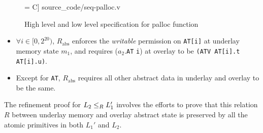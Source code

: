 \begin{figure}[t]\centering
\begin{minipage}{0.55\textwidth}
 = C] {source_code/seq-palloc.v} 
\end{minipage}
\caption{High level and low level specification for palloc function}
\label{fig:palloc:spec}
\hrulefill
\end{figure}




\begin{itemize}%
\item $\forall i \in [0, 2^{20})$, $R_\text{abs}$ enforces the {\em writable}
permission on \verb"AT[i]" at underlay memory state $m_1$, and requires
($a_2$.\verb"AT"  \verb"i") at overlay to be
\verb"(ATV AT[i].t AT[i].u)".

\item Except for \verb"AT", $R_\text{abs}$ requires all other abstract data in
underlay and overlay to be the same.
\end{itemize}
The refinement proof for $L_2 \le_{R} L_1'$ involves the efforts to
prove that this relation $R$ between underlay memory and overlay
abstract state is preserved by all the atomic primitives in both $L_1'$ and $L_2$.

